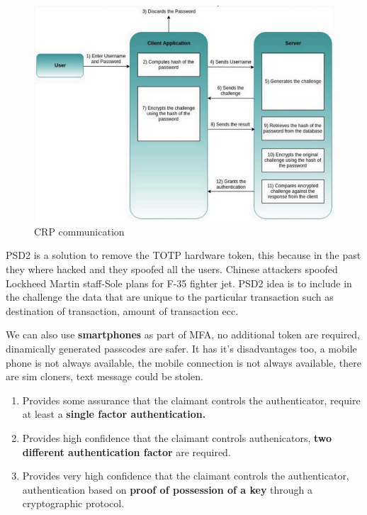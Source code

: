     \begin{figure}[h!]
        \centering
        \includegraphics[scale=0.4]{images/CRP.png}
        \caption{CRP communication}
        \label{fig:CRP}
    \end{figure}
    
    \FloatBarrier   
    
    PSD2 is a solution to remove the TOTP hardware token, this because in the past they where hacked and they spoofed all the users. Chinese attackers spoofed Lockheed Martin staff-Sole plans for F-35 fighter jet. PSD2 idea is to include in the challenge the data that are unique to the particular transaction such as destination of transaction, amount of transaction ecc.
    
    We can also use \textbf{smartphones} as part of MFA, no additional token are required, dinamically generated passcodes are safer. It has it's disadvantages too, a mobile phone is not always available, the mobile connection is not always available, there are sim cloners, text message could be stolen.
    
    \begin{enumerate}
        \item Provides some assurance that the claimant controls the authenticator, require at least a \textbf{single factor authentication.}
        \item Provides high confidence that the claimant controls authenicators, \textbf{two different authentication factor} are required.
        \item Provides very high confidence that the claimant controls the authenticator, authentication based on \textbf{proof of possession of a key} through a cryptographic protocol.
    \end{enumerate}
    
